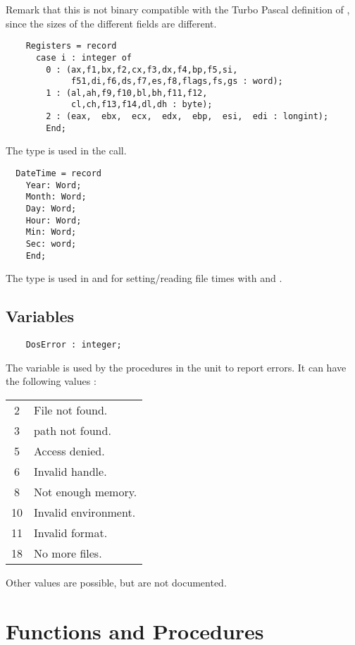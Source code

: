 Remark that this is not binary compatible with the Turbo Pascal definition
of , since the sizes of the different fields are different.
\begin{verbatim}
    Registers = record
      case i : integer of
        0 : (ax,f1,bx,f2,cx,f3,dx,f4,bp,f5,si,
             f51,di,f6,ds,f7,es,f8,flags,fs,gs : word);
        1 : (al,ah,f9,f10,bl,bh,f11,f12,
             cl,ch,f13,f14,dl,dh : byte);
        2 : (eax,  ebx,  ecx,  edx,  ebp,  esi,  edi : longint);
        End;
\end{verbatim}
The   type is used in the  call.
\begin{verbatim}
  DateTime = record
    Year: Word;
    Month: Word;
    Day: Word;
    Hour: Word;
    Min: Word;
    Sec: word;
    End;
\end{verbatim}
The  type is used in  and  for
setting/reading file times with  and .

\subsection{Variables}
\begin{verbatim}
    DosError : integer;
\end{verbatim}
The  variable is used by the procedures in the \dos unit to 
report errors. It can have the following values :
\begin{center}
\begin{tabular}{cl}
2 & File not found. \\
3 & path not found. \\
5 & Access denied. \\
6 & Invalid handle. \\
8 & Not enough memory. \\
10 & Invalid environment. \\
11 & Invalid format. \\
18 & No more files.
\end{tabular}
\end{center}
Other values are possible, but are not documented.

\section{Functions and Procedures}

